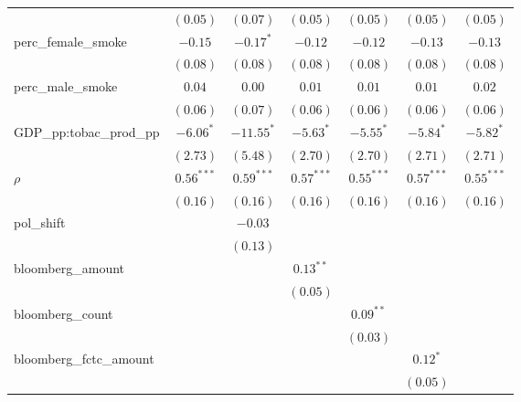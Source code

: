 \begin{table}[!h]
\begin{center}
\begin{tabular}{l c c c c c c }
                        & $(0.05)$      & $(0.07)$     & $(0.05)$     & $(0.05)$     & $(0.05)$      & $(0.05)$      \\
perc\_female\_smoke     & $-0.15$       & $-0.17^{*}$  & $-0.12$      & $-0.12$      & $-0.13$       & $-0.13$       \\
                        & $(0.08)$      & $(0.08)$     & $(0.08)$     & $(0.08)$     & $(0.08)$      & $(0.08)$      \\
perc\_male\_smoke       & $0.04$        & $0.00$       & $0.01$       & $0.01$       & $0.01$        & $0.02$        \\
                        & $(0.06)$      & $(0.07)$     & $(0.06)$     & $(0.06)$     & $(0.06)$      & $(0.06)$      \\
GDP\_pp:tobac\_prod\_pp & $-6.06^{*}$   & $-11.55^{*}$ & $-5.63^{*}$  & $-5.55^{*}$  & $-5.84^{*}$   & $-5.82^{*}$   \\
                        & $(2.73)$      & $(5.48)$     & $(2.70)$     & $(2.70)$     & $(2.71)$      & $(2.71)$      \\
$\rho$                  & $0.56^{***}$  & $0.59^{***}$ & $0.57^{***}$ & $0.55^{***}$ & $0.57^{***}$  & $0.55^{***}$  \\
                        & $(0.16)$      & $(0.16)$     & $(0.16)$     & $(0.16)$     & $(0.16)$      & $(0.16)$      \\
pol\_shift              &               & $-0.03$      &              &              &               &               \\
                        &               & $(0.13)$     &              &              &               &               \\
bloomberg\_amount       &               &              & $0.13^{**}$  &              &               &               \\
                        &               &              & $(0.05)$     &              &               &               \\
bloomberg\_count        &               &              &              & $0.09^{**}$  &               &               \\
                        &               &              &              & $(0.03)$     &               &               \\
bloomberg\_fctc\_amount &               &              &              &              & $0.12^{*}$    &               \\
                        &               &              &              &              & $(0.05)$      &               \\

\end{tabular}
\end{center}
\end{table}
